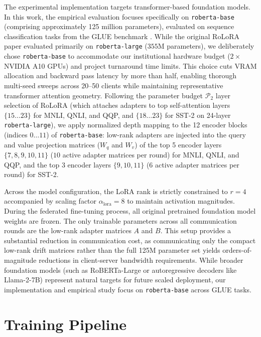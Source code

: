 The experimental implementation targets transformer-based foundation models. In this work, the empirical evaluation focuses specifically on \texttt{roberta-base} \cite{liu2019roberta} (comprising approximately 125 million parameters), evaluated on sequence classification tasks from the GLUE benchmark \cite{wang2019glue}. While the original RoLoRA paper \cite{chen2025robust} evaluated primarily on \texttt{roberta-large} ($355\text{M}$ parameters), we deliberately chose \texttt{roberta-base} to accommodate our institutional hardware budget ($2 \times$ NVIDIA A10 GPUs) and project turnaround time limits. This choice cuts VRAM allocation and backward pass latency by more than half, enabling thorough multi-seed sweeps across 20--50 clients while maintaining representative transformer attention geometry. Following the parameter budget $\mathcal{P}_2$ layer selection of RoLoRA \cite{chen2025robust} (which attaches adapters to top self-attention layers $\{15\dots 23\}$ for MNLI, QNLI, and QQP, and $\{18\dots 23\}$ for SST-2 on 24-layer \texttt{roberta-large}), we apply normalized depth mapping to the 12 encoder blocks (indices $0\dots 11$) of \texttt{roberta-base}: low-rank adapters are injected into the query and value projection matrices ($W_q$ and $W_v$) of the top 5 encoder layers $\{7, 8, 9, 10, 11\}$ ($10$ active adapter matrices per round) for MNLI, QNLI, and QQP, and the top 3 encoder layers $\{9, 10, 11\}$ ($6$ active adapter matrices per round) for SST-2.

Across the model configuration, the LoRA rank is strictly constrained to $r = 4$ accompanied by scaling factor $\alpha_{\text{lora}} = 8$ to maintain activation magnitudes. During the federated fine-tuning process, all original pretrained foundation model weights are frozen. The only trainable parameters across all communication rounds are the low-rank adapter matrices $A$ and $B$. This setup provides a substantial reduction in communication cost, as communicating only the compact low-rank drift matrices rather than the full 125M parameter set yields orders-of-magnitude reductions in client-server bandwidth requirements. While broader foundation models (such as RoBERTa-Large or autoregressive decoders like Llama-2-7B) represent natural targets for future scaled deployment, our implementation and empirical study focus on \texttt{roberta-base} across GLUE tasks.

\section{Training Pipeline}
\label{sec:impl_training_pipeline}


